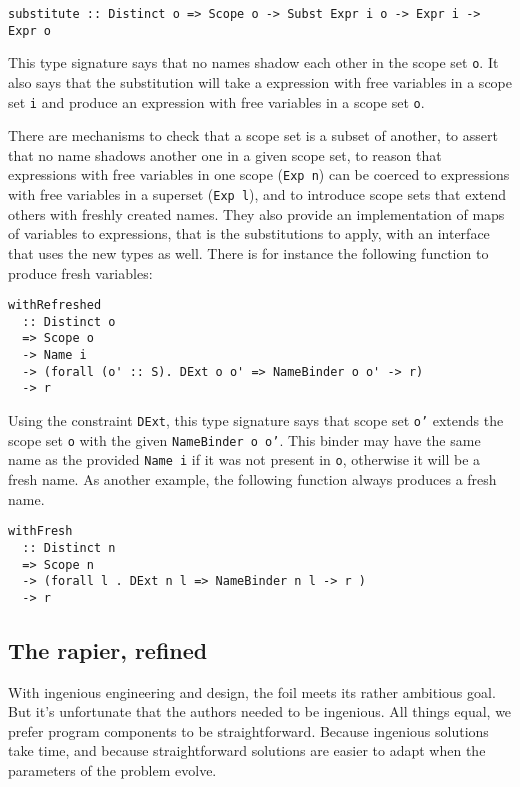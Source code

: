 \documentclass[sigconf, anonymous, review]{acmart}
\newcommand{\tc}[1]{{\small\texttt{#1}}}
\begin{document}
\begin{verbatim}
substitute :: Distinct o => Scope o -> Subst Expr i o -> Expr i -> Expr o
\end{verbatim}

This type signature says that no names shadow each other in the scope set \tc{o}.
It also says that the substitution will take a expression with free variables in
a scope set \tc{i} and produce an expression with free variables in a scope set
\tc{o}.

There
are mechanisms to check that a scope set is a subset of another, to assert that no
name shadows another one in a given scope set, to reason that expressions
with free variables in one scope (\tc{Exp n}) can be coerced to expressions with
free variables in a superset (\tc{Exp l}), and to introduce scope sets that extend
others with freshly created names. They also provide an implementation of maps of
variables to expressions, that is the substitutions to apply, with an interface
that uses the new types as well. There is for instance the following function to
produce fresh variables:

\begin{verbatim}
withRefreshed
  :: Distinct o
  => Scope o
  -> Name i
  -> (forall (o' :: S). DExt o o' => NameBinder o o' -> r)
  -> r
\end{verbatim}

Using the constraint \tc{DExt}, this type signature says that scope set \tc{o'}
extends the scope set \tc{o} with the given \tc{NameBinder o o'}. This binder
may have the same name as the provided \tc{Name i} if it was not present in
\tc{o}, otherwise it will be a fresh name. As another example, the following
function always produces a fresh name.

\begin{verbatim}
withFresh
  :: Distinct n
  => Scope n
  -> (forall l . DExt n l => NameBinder n l -> r )
  -> r
\end{verbatim}

\subsection{The rapier, refined}
\label{the-rapier-with-refinement-types}

With ingenious engineering and design, the foil meets its rather ambitious goal.
But it's unfortunate that the authors needed to be ingenious. All things equal,
we prefer program components to be straightforward. Because ingenious solutions
take time, and because straightforward solutions are easier to adapt when the
parameters of the problem evolve.
\end{document}
